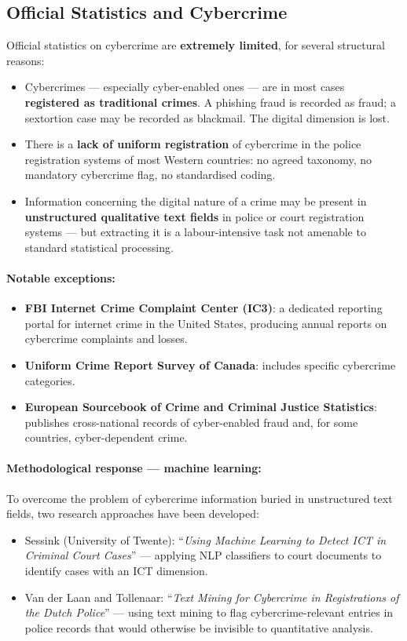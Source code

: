 \documentclass[11pt,a4paper,openany]{report}
\theoremstyle{definition}
\theoremstyle{plain}
\theoremstyle{remark}
\begin{document}
\subsection{Official Statistics and Cybercrime}

Official statistics on cybercrime are \textbf{extremely limited}, for several structural reasons:

\begin{itemize}
    \item Cybercrimes --- especially cyber-enabled ones --- are in most cases \textbf{registered as traditional crimes}. A phishing fraud is recorded as fraud; a sextortion case may be recorded as blackmail. The digital dimension is lost.
    \item There is a \textbf{lack of uniform registration} of cybercrime in the police registration systems of most Western countries: no agreed taxonomy, no mandatory cybercrime flag, no standardised coding.
    \item Information concerning the digital nature of a crime may be present in \textbf{unstructured qualitative text fields} in police or court registration systems --- but extracting it is a labour-intensive task not amenable to standard statistical processing.
\end{itemize}

\paragraph{Notable exceptions:}
\begin{itemize}
    \item \textbf{FBI Internet Crime Complaint Center (IC3)}: a dedicated reporting portal for internet crime in the United States, producing annual reports on cybercrime complaints and losses.
    \item \textbf{Uniform Crime Report Survey of Canada}: includes specific cybercrime categories.
    \item \textbf{European Sourcebook of Crime and Criminal Justice Statistics}: publishes cross-national records of cyber-enabled fraud and, for some countries, cyber-dependent crime.
\end{itemize}

\paragraph{Methodological response --- machine learning:}
To overcome the problem of cybercrime information buried in unstructured text fields, two research approaches have been developed:
\begin{itemize}
    \item Sessink (University of Twente): ``\textit{Using Machine Learning to Detect ICT in Criminal Court Cases}'' --- applying NLP classifiers to court documents to identify cases with an ICT dimension.
    \item Van der Laan and Tollenaar: ``\textit{Text Mining for Cybercrime in Registrations of the Dutch Police}'' --- using text mining to flag cybercrime-relevant entries in police records that would otherwise be invisible to quantitative analysis.
\end{itemize}
\end{document}
